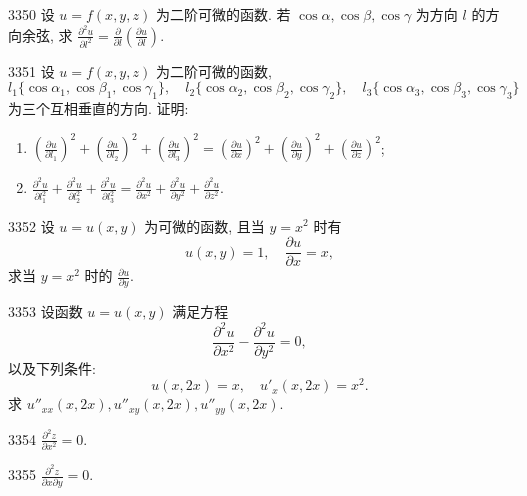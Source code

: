 \begin{prob}[M]{3350}
设 $u = f(x, y, z)$ 为二阶可微的函数. 若 $\cos\alpha, \cos\beta, \cos\gamma$ 为方向 $l$ 的方向余弦, 求 $\frac{\partial^2 u}{\partial l^2} = \frac{\partial}{\partial l}\left(\frac{\partial u}{\partial l}\right)$.
\end{prob}

\begin{prob}[M]{3351}
设 $u = f(x, y, z)$ 为二阶可微的函数,
\[
l_1\{\cos\alpha_1, \cos\beta_1, \cos\gamma_1\}, \quad l_2\{\cos\alpha_2, \cos\beta_2, \cos\gamma_2\}, \quad l_3\{\cos\alpha_3, \cos\beta_3, \cos\gamma_3\}
\]
为三个互相垂直的方向. 证明:
\begin{enumerate}[label=(\alph*), itemsep=2pt, topsep=3pt]
\item $\left(\frac{\partial u}{\partial l_1}\right)^2 + \left(\frac{\partial u}{\partial l_2}\right)^2 + \left(\frac{\partial u}{\partial l_3}\right)^2 = \left(\frac{\partial u}{\partial x}\right)^2 + \left(\frac{\partial u}{\partial y}\right)^2 + \left(\frac{\partial u}{\partial z}\right)^2$;
\item $\frac{\partial^2 u}{\partial l_1^2} + \frac{\partial^2 u}{\partial l_2^2} + \frac{\partial^2 u}{\partial l_3^2} = \frac{\partial^2 u}{\partial x^2} + \frac{\partial^2 u}{\partial y^2} + \frac{\partial^2 u}{\partial z^2}$.
\end{enumerate}
\end{prob}

\begin{prob}[M]{3352}
设 $u = u(x, y)$ 为可微的函数, 且当 $y = x^2$ 时有
\[
u(x, y) = 1, \quad \frac{\partial u}{\partial x} = x,
\]
求当 $y = x^2$ 时的 $\frac{\partial u}{\partial y}$.
\end{prob}

\begin{prob}[M]{3353}
设函数 $u = u(x, y)$ 满足方程
\[
\frac{\partial^2 u}{\partial x^2} - \frac{\partial^2 u}{\partial y^2} = 0,
\]
以及下列条件:
\[
u(x, 2x) = x, \quad u'_x(x, 2x) = x^2.
\]
求 $u''_{xx}(x, 2x), u''_{xy}(x, 2x), u''_{yy}(x, 2x)$.
\end{prob}


\begin{prob}[S]{3354}
$\frac{\partial^2 z}{\partial x^2} = 0$.
\end{prob}

\begin{prob}[S]{3355}
$\frac{\partial^2 z}{\partial x\partial y} = 0$.
\end{prob}


